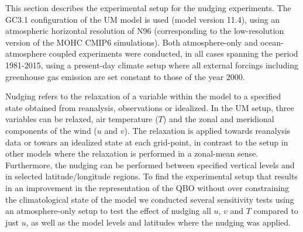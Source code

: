 
%
%


This section describes the experimental setup for the nudging experiments. 
The GC3.1 configuration of the UM model is used (model version 11.4), using an atmospheric horizontal resolution of N96 (corresponding to the low-resolution version of the MOHC CMIP6 simulations). 
Both atmosphere-only and ocean-atmosphere coupled experiments were conducted, in all cases spanning the period 1981-2015, using a present-day climate setup where all external forcings including greenhouse gas emission are set constant to those of the year 2000. %

Nudging refers to the relaxation of a variable within the model to a specified state obtained from reanalysis, observations or idealized. In the UM setup, three variables can be relaxed, air temperature ($T$) and the zonal and meridional components of the wind ($u$ and $v$). The relaxation is applied towards reanalysis data or towars an idealized state at each grid-point, in contrast to the setup in other models \citep[e.g.][]{martin2021} where the relaxation is performed in a zonal-mean sense.
 Furthermore, the nudging can be performed between specified vertical levels and in selected latitude/longitude regions. %
 To find the experimental setup that results in an improvement in the representation of the QBO without over constraining the climatological state of the model we conducted several sensitivity tests using an atmosphere-only setup to test the effect of nudging all $u$, $v$ and $T$ compared to just $u$, as well as the model levels and latitudes where the nudging was applied. 

